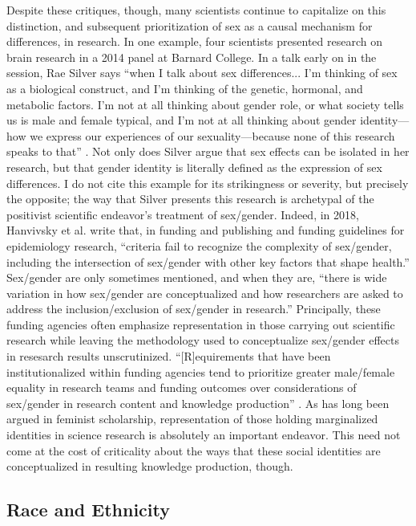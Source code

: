 Despite these critiques, though, many scientists continue to capitalize on this distinction, and subsequent prioritization of sex as a causal mechanism for differences, in research. In one example, four scientists presented research on brain research in a 2014 panel at Barnard College. In a talk early on in the session, Rae Silver says ``when I talk about sex differences... I'm thinking of sex as a biological construct, and I'm thinking of the genetic, hormonal, and metabolic factors. I'm not at all thinking about gender role, or what society tells us is male and female typical, and I'm not at all thinking about gender identity---how we express our experiences of our sexuality---because none of this research speaks to that'' \cite{barnard}. Not only does Silver argue that sex effects can be isolated in her research, but that gender identity is literally defined as the expression of sex differences. I do not cite this example for its strikingness or severity, but precisely the opposite; the way that Silver presents this research is archetypal of the positivist scientific endeavor's treatment of sex/gender. Indeed, in 2018, Hanvivsky et al. write that, in funding and publishing and funding guidelines for epidemiology research, ``criteria fail to recognize the complexity of sex/gender, including the intersection of sex/gender with other key factors that shape health.'' Sex/gender are only sometimes mentioned, and when they are, ``there is wide variation in how sex/gender are conceptualized and how researchers are asked to address the inclusion/exclusion of sex/gender in research.'' Principally, these funding agencies often emphasize representation in those carrying out scientific research while leaving the methodology used to conceptualize sex/gender effects in resesarch results unscrutinized. ``[R]equirements that have been institutionalized within funding agencies tend to prioritize greater male/female equality in research teams and funding outcomes over considerations of sex/gender in research content and knowledge production'' \cite{hanvivsky2018}. As has long been argued in feminist scholarship, representation of those holding marginalized identities in science research is absolutely an important endeavor. This need not come at the cost of criticality about the ways that these social identities are conceptualized in resulting knowledge production, though.

\subsection{Race and Ethnicity} \label{sec:race-ethnic}


